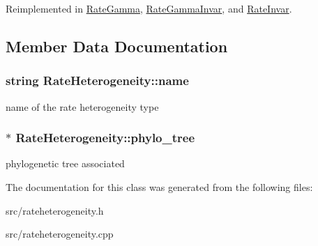 Reimplemented in \hyperlink{classRateGamma_a88ffb33131f2cf23cfd0525e092c7717}{RateGamma}, \hyperlink{classRateGammaInvar_a13b6629de9e3579aacff555f1bd76db5}{RateGammaInvar}, and \hyperlink{classRateInvar_aabcef1cc18777b54b0f8644ccb00913c}{RateInvar}.

\subsection{Member Data Documentation}
\hypertarget{classRateHeterogeneity_aec54d9090abff011fb0c437d51b1d759}{
\subsubsection[{name}]{\setlength{\rightskip}{0pt plus 5cm}string {\bf RateHeterogeneity::name}}}
\label{classRateHeterogeneity_aec54d9090abff011fb0c437d51b1d759}
name of the rate heterogeneity type \hypertarget{classRateHeterogeneity_a15901cd491ded27a2d8cd4ddb731e647}{
\subsubsection[{phylo\_\-tree}]{$\ast$ {\bf RateHeterogeneity::phylo\_\-tree}}}
\label{classRateHeterogeneity_a15901cd491ded27a2d8cd4ddb731e647}
phylogenetic tree associated 

The documentation for this class was generated from the following files:\begin{DoxyCompactItemize}
\item 
src/rateheterogeneity.h\item 
src/rateheterogeneity.cpp\end{DoxyCompactItemize}
